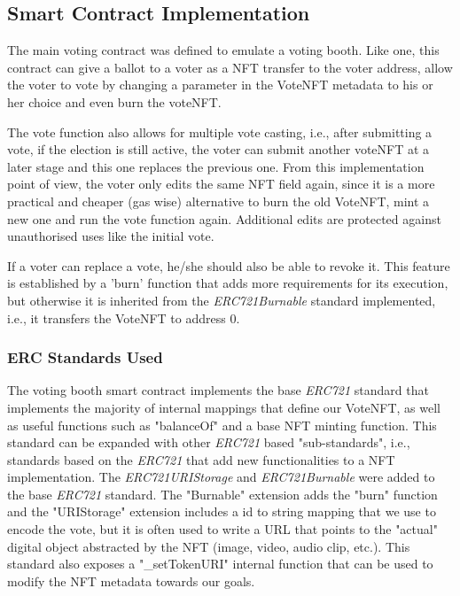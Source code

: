 \documentclass[../main.tex]{subfiles}
\begin{document}
\subsection{Smart Contract Implementation}
The main voting contract was defined to emulate a voting booth. Like one, this contract can give a ballot to a voter as a NFT transfer to the voter address, allow the voter to vote by changing a parameter in the VoteNFT metadata to his or her choice and even burn the voteNFT.
\par
The vote function also allows for multiple vote casting, i.e., after submitting a vote, if the election is still active, the voter can submit another voteNFT at a later stage and this one replaces the previous one. From this implementation point of view, the voter only edits the same NFT field again, since it is a more practical and cheaper (gas wise) alternative to burn the old VoteNFT, mint a new one and run the vote function again. Additional edits are protected against unauthorised uses like the initial vote.
\par
If a voter can replace a vote, he/she should also be able to revoke it. This feature is established by a 'burn' function that adds more requirements for its execution, but otherwise it is inherited from the \textit{ERC721Burnable} standard implemented, i.e., it transfers the VoteNFT to address 0.

\subsubsection{ERC Standards Used}
The voting booth smart contract implements the base \textit{ERC721} standard that implements the majority of internal mappings that define our VoteNFT, as well as useful functions such as "balanceOf" and a base NFT minting function. This standard can be expanded with other \textit{ERC721} based "sub-standards", i.e., standards based on the \textit{ERC721} that add new functionalities to a NFT implementation. The \textit{ERC721URIStorage} and \textit{ERC721Burnable} were added to the base \textit{ERC721} standard. The "Burnable" extension adds the "burn" function and the "URIStorage" extension includes a id to string mapping that we use to encode the vote, but it is often used to write a URL that points to the "actual" digital object abstracted by the NFT (image, video, audio clip, etc.). This standard also exposes a "\_setTokenURI" internal function that can be used to modify the NFT metadata towards our goals.
\end{document}
